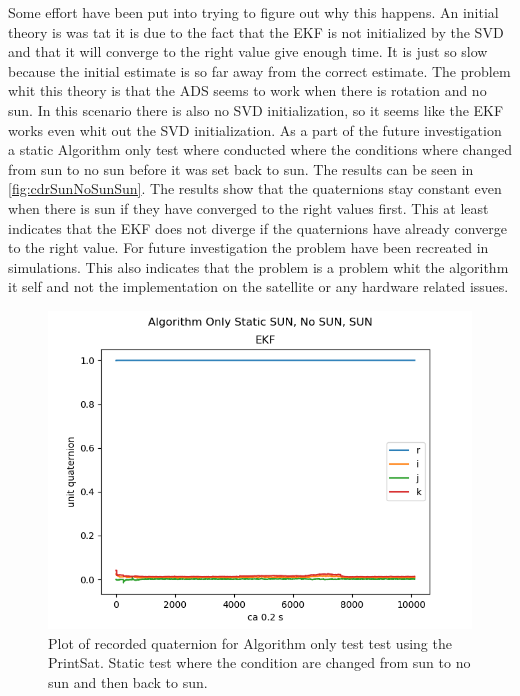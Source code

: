 Some effort have been put into trying to figure out why this happens. An initial theory is was tat it is due to the fact that the EKF is not initialized by the SVD and that it will converge to the right value give enough time. It is just so slow because the initial estimate is so far away from the correct estimate. The problem whit this theory is that the ADS seems to work when there is rotation and no sun. In this scenario there is also no SVD initialization, so it seems like the EKF works even whit out the SVD initialization. As a part of the future investigation a static Algorithm only test where conducted where the conditions where changed from sun to no sun before it was set back to sun. The results can be seen in \autoref{fig:cdrSunNoSunSun}. The results show that the quaternions stay constant even when there is sun if they have converged to the right values first. This at least indicates that the EKF does not diverge if the quaternions have already converge to the right value. For future investigation the problem have been recreated in simulations. This also indicates that the problem is a problem whit the algorithm it self and not the implementation on the satellite or any hardware related issues. 

\begin{figure}[tbp]
	\centering
	\includegraphics[width=1\columnwidth]{./Pictures/cdrRun1StaticSunEclipsSun}
	\caption{Plot of recorded quaternion for Algorithm only test test using the PrintSat. Static test where the condition are changed from sun to no sun and then back to sun. }
	\label{fig:cdrSunNoSunSun}
\end{figure} 

